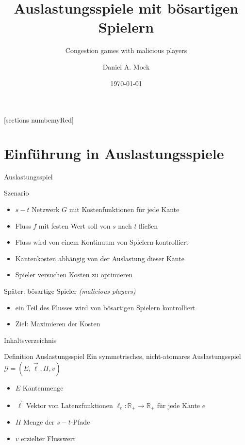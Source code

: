 \documentclass{beamer}
\title{Auslastungsspiele mit bösartigen Spielern}
\subtitle{Congestion games with malicious players}
\date{\today}
\author{Daniel A. Mock}
\institute{Lehrstuhl i1 -- RWTH Aachen}
\begin{document}
\maketitle

[sections numbemyRed]

\section{Einführung in Auslastungsspiele}
\begin{frame}{Auslastungsspiel}
	\begin{block}{Szenario}
		\begin{itemize}
			\item $s-t$ Netzwerk $G$ mit Kostenfunktionen für jede Kante
			\item Fluss $f$ mit festen Wert soll von $s$ nach $t$ fließen
			\item Fluss wird von einem Kontinuum von Spielern kontrolliert
			\item Kantenkosten abhängig von der Auslastung dieser Kante
			\item Spieler versuchen Kosten zu optimieren
		\end{itemize}
	\end{block}

	\begin{block}{Später: bösartige Spieler \emph{(malicious players)}}
		\begin{itemize}
			\item ein Teil des Flusses wird von bösartigen Spielern kontrolliert
			\item Ziel: Maximieren der Kosten
		\end{itemize}
	\end{block}
\end{frame}

\begin{frame}{Inhaltsverzeichnis}
	\tableofcontents
\end{frame}

\begin{frame}{Definition Auslastungsspiel}
	Ein symmetrisches, nicht-atomares \alert{Auslastungsspiel} $\mathcal G = (E, \vec{\ell}, \Pi, v)$
	\begin{itemize}
		\item $E$ Kantenmenge
		\item $\vec{\ell}$ Vektor von Latenzfunktionen $\ell_e : \mathbb R_+ \to \mathbb R_+$ für jede Kante $e$
		\item $\Pi$ Menge der $s-t$-Pfade
		\item $v$ erzielter Flusswert
	\end{itemize}
\end{frame}
\end{document}
